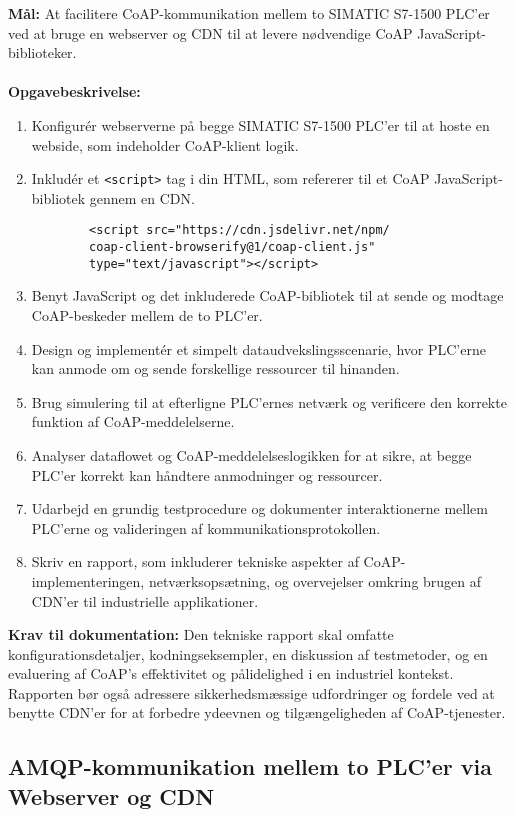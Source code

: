 \textbf{Mål:} At facilitere CoAP-kommunikation mellem to SIMATIC S7-1500 PLC'er ved at bruge en webserver og CDN til at levere nødvendige CoAP JavaScript-biblioteker.
\\\\
\noindent\textbf{Opgavebeskrivelse:}
\begin{enumerate}
	\item Konfigurér webserverne på begge SIMATIC S7-1500 PLC'er til at hoste en webside, som indeholder CoAP-klient logik.
	\item Inkludér et \texttt{<script>} tag i din HTML, som refererer til et CoAP JavaScript-bibliotek gennem en CDN. 
	
	\begin{verbatim}
		<script src="https://cdn.jsdelivr.net/npm/
		coap-client-browserify@1/coap-client.js" 
		type="text/javascript"></script>
	\end{verbatim}
	\item Benyt JavaScript og det inkluderede CoAP-bibliotek til at sende og modtage CoAP-beskeder mellem de to PLC'er.
	\item Design og implementér et simpelt dataudvekslingsscenarie, hvor PLC'erne kan anmode om og sende forskellige ressourcer til hinanden.
	\item Brug simulering til at efterligne PLC'ernes netværk og verificere den korrekte funktion af CoAP-meddelelserne.
	\item Analyser dataflowet og CoAP-meddelelseslogikken for at sikre, at begge PLC'er korrekt kan håndtere anmodninger og ressourcer.
	\item Udarbejd en grundig testprocedure og dokumenter interaktionerne mellem PLC'erne og valideringen af kommunikationsprotokollen.
	\item Skriv en rapport, som inkluderer tekniske aspekter af CoAP-implementeringen, netværksopsætning, og overvejelser omkring brugen af CDN'er til industrielle applikationer.
\end{enumerate}
\textbf{Krav til dokumentation:} Den tekniske rapport skal omfatte konfigurationsdetaljer, kodningseksempler, en diskussion af testmetoder, og en evaluering af CoAP's effektivitet og pålidelighed i en industriel kontekst. Rapporten bør også adressere sikkerhedsmæssige udfordringer og fordele ved at benytte CDN'er for at forbedre ydeevnen og tilgængeligheden af CoAP-tjenester.

\subsection*{AMQP-kommunikation mellem to PLC'er via Webserver og CDN}
\label{subsec:amqp_communication_plc_cdn}

